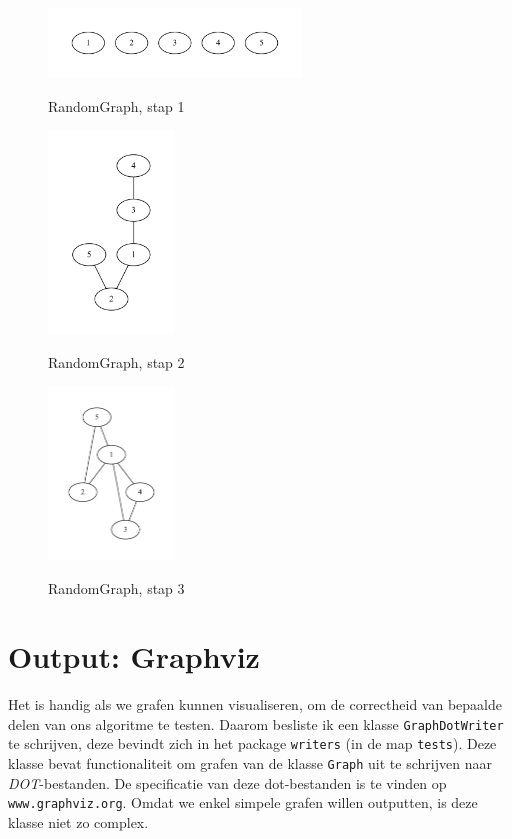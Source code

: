 \documentclass{article}
\begin{document}
\begin{figure}
\begin{center}
\includegraphics[width=0.6\textwidth]{images/randomgraph-01.pdf}
\caption{RandomGraph, stap 1}
\label{fig:randomgraph-01}
\includegraphics[width=0.3\textwidth]{images/randomgraph-02.pdf}
\caption{RandomGraph, stap 2}
\label{fig:randomgraph-02}
\includegraphics[width=0.3\textwidth]{images/randomgraph-03.pdf}
\caption{RandomGraph, stap 3}
\label{fig:randomgraph-03}
\end{center}
\end{figure}

\section{Output: Graphviz}
Het is handig als we grafen kunnen visualiseren, om de correctheid van bepaalde
delen van ons algoritme te testen. Daarom besliste ik een klasse
\verb#GraphDotWriter# te schrijven, deze bevindt zich in het package
\verb#writers# (in de map \verb#tests#). Deze klasse bevat functionaliteit om
grafen van de klasse \verb#Graph# uit te schrijven naar \emph{DOT}-bestanden. De
specificatie van deze dot-bestanden is te vinden op \verb#www.graphviz.org#.
Omdat we enkel simpele grafen willen outputten, is deze klasse niet zo complex.
\end{document}

